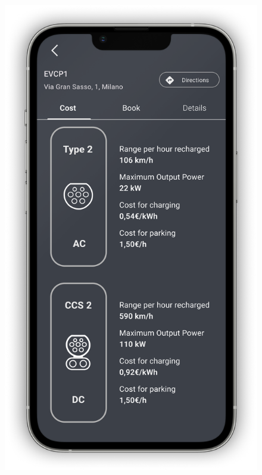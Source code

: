 \begin{figure}[H]
{        \includegraphics[scale=0.32]{src/mockups/book_cost.png}
    }
    \newline
\end{figure}

